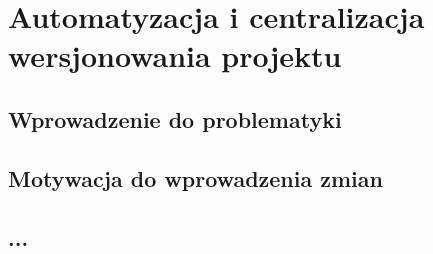 \clearpage
\section{Automatyzacja i centralizacja wersjonowania projektu}
\label{ch:versioning}

\subsection{Wprowadzenie do problematyki}

\subsection{Motywacja do wprowadzenia zmian}

\subsection{...}